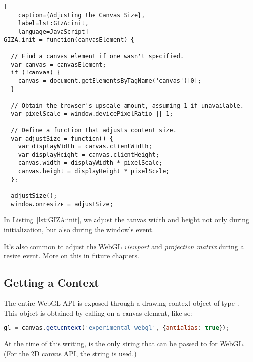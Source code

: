 \begin{lstlisting}[
    caption={Adjusting the Canvas Size},
    label=lst:GIZA:init,
    language=JavaScript]
GIZA.init = function(canvasElement) {

  // Find a canvas element if one wasn't specified.
  var canvas = canvasElement;
  if (!canvas) {
    canvas = document.getElementsByTagName('canvas')[0];
  }

  // Obtain the browser's upscale amount, assuming 1 if unavailable.
  var pixelScale = window.devicePixelRatio || 1;

  // Define a function that adjusts content size.
  var adjustSize = function() {
    var displayWidth = canvas.clientWidth;
    var displayHeight = canvas.clientHeight;
    canvas.width = displayWidth * pixelScale;
    canvas.height = displayHeight * pixelScale;
  };

  adjustSize();
  window.onresize = adjustSize;
\end{lstlisting}

In Listing~\ref{lst:GIZA:init}, we adjust the canvas width and height not only during initialization, but also during the window's   event.

\begin{sidenote}
It's also common to adjust the WebGL \emph{viewport} and \emph{projection matrix} during a resize event.  More on this in future chapters.
\end{sidenote}

\subsection{Getting a Context}
\label{sec:context}

The entire WebGL API is exposed through a drawing context  object of type  .  This object is obtained by calling   on a canvas element, like so:

\begin{lstlisting}[language=JavaScript]
  gl = canvas.getContext('experimental-webgl', {antialias: true});
\end{lstlisting}

At the time of this writing,   is the only string that can be passed to  for WebGL.  (For the 2D canvas API, the string  is used.)


